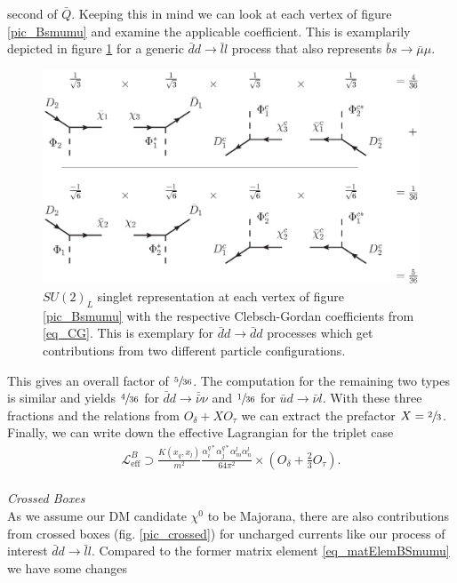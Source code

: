 second of $\bar Q$. Keeping this in mind we can look at each vertex of figure \ref{pic_Bsmumu} and examine the applicable coefficient. This is examplarily
depicted in figure \ref{pic_CG} for a generic $\bar d d\rightarrow \bar l l$ process that also represents $\bar b s \rightarrow \bar \mu \mu$.
\begin{figure}[t]
 \includegraphics[width=\textwidth]{../pics/CG.eps}
 \caption{$SU(2)_L$ singlet representation at each vertex of figure \ref{pic_Bsmumu} with the respective Clebsch-Gordan coefficients from \eqref{eq_CG}. 
 This is exemplary for $\bar d d\rightarrow \bar d d$ processes which get contributions from two different particle configurations.}
 \label{pic_CG}
\end{figure}
This gives an overall factor of $\sfrac{5}{36}$. The computation for the remaining two types is similar and yields $\sfrac{4}{36}$ for 
$\bar d d\rightarrow \bar \bar \nu \nu$ and $\sfrac{1}{36}$ for $\bar u d \rightarrow \bar \nu l$. With these three fractions and the relations from $O_\delta + X O_\tau$
we can extract the prefactor $X=\sfrac23$. Finally, we can write down the effective Lagrangian for the triplet case
\begin{align}
 \mathcal{L}^B_\text{eff} \supset \frac{K(x_q,x_l)}{m^2}\frac{\alpha_i^{q*} \alpha_j^{q*} \alpha_m^l \alpha_n^l}{64\pi^2}\times\left(O_\delta + \frac23 O_\tau\right).
 \label{eq_LagBSmumuModB}
\end{align}
\\ \textit{Crossed Boxes}\\
\noindent As we assume our DM candidate $\chi^0$ to be Majorana, there are also contributions from crossed boxes (fig. \ref{pic_crossed}) for uncharged
currents like our process of interest $\bar d d\rightarrow \bar l l$. Compared to the former matrix element \eqref{eq_matElemBSmumu} we have some changes
